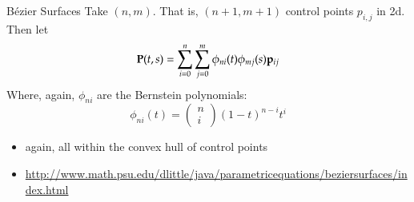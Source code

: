 \documentclass[10pt]{beamer}
\newcommand{\vp}{{\bf{p}}}
\newcommand{\vP}{{\bf{P}}}
\begin{document}
\begin{frame}{B\'ezier Surfaces}
Take $(n,m)$.  That is, $(n+1,m+1)$ control points $p_{i,j}$ in 2d.  Then let
\begin{equation*}
  \vP(t,s) = \sum_{i=0}^{n} \sum_{j=0}^m \phi_{ni}(t) \phi_{mj}(s) \vp_{ij}
\end{equation*}
Where, again, $\phi_{ni}$ are the Bernstein polynomials:
\begin{equation*}
  \phi_{ni}(t) = \begin{pmatrix}n\\i\end{pmatrix} (1-t)^{n-i} t^i
\end{equation*}
  \begin{itemize}
  \item again, all within the convex hull of control points
  \item \url{http://www.math.psu.edu/dlittle/java/parametricequations/beziersurfaces/index.html}
  \end{itemize}
\end{frame}
\end{document}
